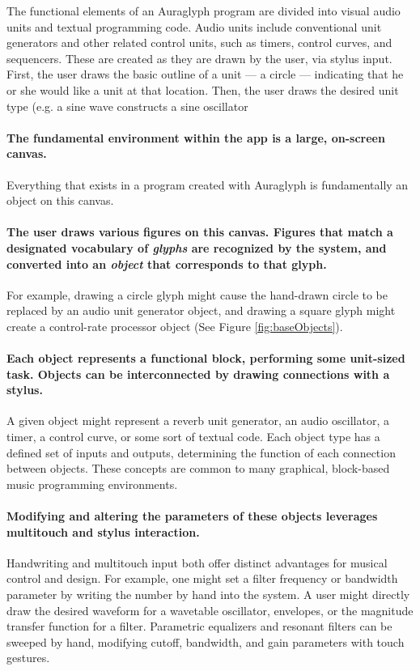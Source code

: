 \documentclass[10pt,letterpaper]{article}
\begin{document}
The functional elements of an Auraglyph program are divided into visual audio units and textual programming code. 
Audio units include conventional unit generators and other related control units, such as timers, control curves, and sequencers. 
These are created as they are drawn by the user, via stylus input. 
First, the user draws the basic outline of a unit --- a circle --- indicating that he or she would like a unit at that location. 
Then, the user draws the desired unit type (e.g. a sine wave constructs a sine oscillator

\paragraph{The fundamental environment within the app is a large, on-screen canvas.} 
Everything that exists in a program created with Auraglyph is fundamentally an object on this canvas. 

\paragraph{The user draws various figures on this canvas. 
Figures that match a designated vocabulary of \emph{glyphs} are recognized by the system, and converted into an \emph{object} that corresponds to that glyph.} 
For example, drawing a circle glyph might cause the hand-drawn circle to be replaced by an audio unit generator object, and drawing a square glyph might create a control-rate processor object (See Figure \ref{fig:baseObjects}).

\paragraph{Each object represents a functional block, performing some unit-sized task.
Objects can be interconnected by drawing connections with a stylus.}
A given object might represent a reverb unit generator, an audio oscillator, a timer, a control curve, or some sort of textual code. 
Each object type has a defined set of inputs and outputs, determining the function of each connection between objects. 
These concepts are common to many graphical, block-based music programming environments. 

\paragraph{Modifying and altering the parameters of these objects leverages multitouch and stylus interaction.}
Handwriting and multitouch input both offer distinct advantages for musical control and design. 
For example, one might set a filter frequency or bandwidth parameter by writing the number by hand into the system. 
A user might directly draw the desired waveform for a wavetable oscillator, envelopes, or the magnitude transfer function for a filter. 
Parametric equalizers and resonant filters can be sweeped by hand, modifying cutoff, bandwidth, and gain parameters with touch gestures. 
\end{document}
